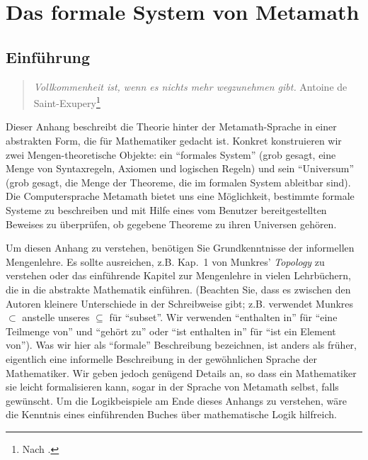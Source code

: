 \chapter{Das formale System von Metamath}\label{formalspec}

\section{Einführung}

\begin{quote}
  {\em Vollkommenheit ist, wenn es nichts mehr wegzunehmen gibt.}
    \flushright\sc Antoine de Saint-Exupery\footnote{Nach \cite[S.~3-25]{Campbell}.}\\
\end{quote}

Dieser Anhang beschreibt die Theorie hinter der Metamath-Sprache in einer abstrakten Form, die für Mathematiker gedacht ist.  Konkret konstruieren wir zwei Mengen-theoretische Objekte: ein "`formales System"' (grob gesagt, eine Menge von Syntaxregeln, Axiomen und logischen Regeln) und sein "`Universum"' (grob gesagt, die Menge der Theoreme, die im formalen System ableitbar sind).  Die Computersprache Metamath bietet uns eine Möglichkeit, bestimmte formale Systeme zu beschreiben und mit Hilfe eines vom Benutzer bereitgestellten Beweises zu überprüfen, ob gegebene Theoreme zu ihren Universen gehören. 

Um diesen Anhang zu verstehen, benötigen Sie Grundkenntnisse der informellen Mengenlehre. Es sollte ausreichen, z.B. Kap.\ 1 von Munkres' {\em Topology} zu verstehen\cite{Munkres} oder das einführende Kapitel zur Mengenlehre in vielen Lehrbüchern, die in die abstrakte Mathematik einführen. (Beachten Sie, dass es zwischen den Autoren kleinere Unterschiede in der Schreibweise gibt; z.B. verwendet Munkres $\subset$ anstelle unseres $\subseteq$ für "`subset"'.  Wir verwenden "`enthalten in"' für "`eine Teilmenge von"' und "`gehört zu"' oder "`ist enthalten in"' für "`ist ein Element von"'). Was wir hier als "`formale"' Beschreibung bezeichnen, ist anders als früher, eigentlich eine informelle Beschreibung in der gewöhnlichen Sprache der Mathematiker.  Wir geben jedoch genügend Details an, so dass ein Mathematiker sie leicht formalisieren kann, sogar in der Sprache von Metamath selbst, falls gewünscht.  Um die Logikbeispiele am Ende dieses Anhangs zu verstehen, wäre die Kenntnis eines einführenden Buches über mathematische Logik hilfreich. 

